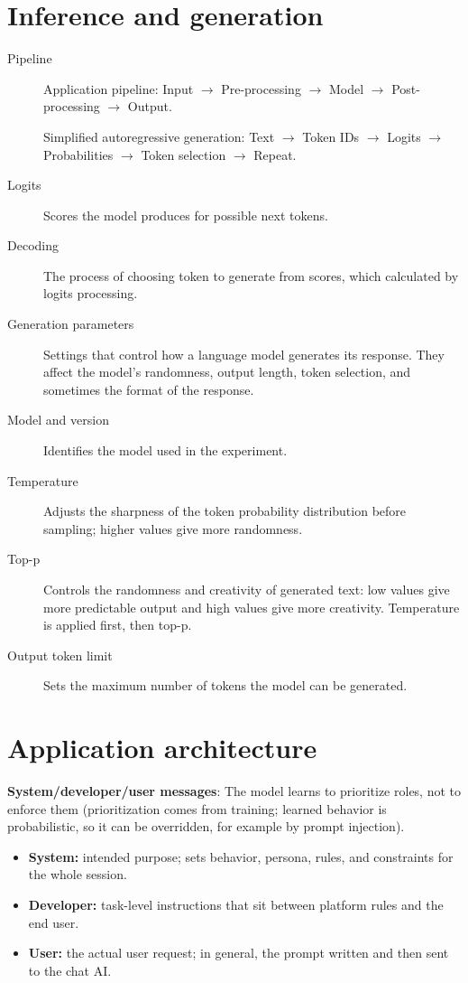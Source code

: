 \documentclass[a4paper,12pt]{report}
\begin{document}
\section{Inference and generation}
\begin{description}
  \item[Pipeline] Application pipeline: Input $\rightarrow$ Pre-processing $\rightarrow$ Model $\rightarrow$ Post-processing $\rightarrow$ Output.
  \par\smallskip
  Simplified autoregressive generation: Text $\rightarrow$ Token IDs $\rightarrow$ Logits $\rightarrow$ Probabilities $\rightarrow$ Token selection $\rightarrow$ Repeat.

  \item[Logits] Scores the model produces for possible next tokens.

  \item[Decoding] The process of choosing token to generate from scores, which calculated by logits processing.

  \item[Generation parameters] Settings that control how a language model generates its response. They affect the model's randomness, output length, token selection, and sometimes the format of the response.

  \item[Model and version] Identifies the model used in the experiment.

  \item[Temperature] Adjusts the sharpness of the token probability distribution before sampling; higher values give more randomness.

  \item[Top-p] Controls the randomness and creativity of generated text: low values give more predictable output and high values give more creativity. Temperature is applied first, then top-p.

  \item[Output token limit] Sets the maximum number of tokens the model can be generated.
\end{description}

\section{Application architecture}

\textbf{System/developer/user messages}: The model learns to prioritize roles, not to enforce them (prioritization comes from training; learned behavior is probabilistic, so it can be overridden, for example by prompt injection).
\begin{itemize}
\item \textbf{System:} intended purpose; sets behavior, persona, rules, and constraints for the whole session.
\item \textbf{Developer:} task-level instructions that sit between platform rules and the end user.
\item \textbf{User:} the actual user request; in general, the prompt written and then sent to the chat AI.
\end{itemize}
\end{document}
